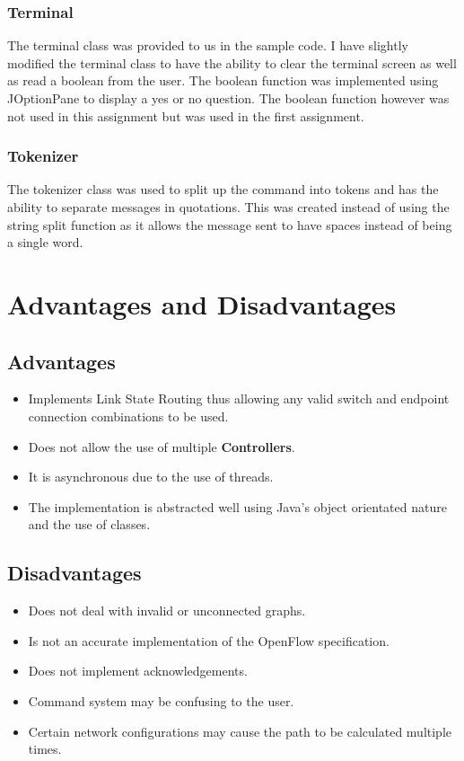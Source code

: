\documentclass{article}
\begin{document}
\subsubsection{Terminal}
The terminal class was provided to us in the sample code. I have slightly
modified the terminal class to have the ability to clear the terminal screen
as well as read a boolean from the user. The boolean function was implemented
using JOptionPane to display a yes or no question. The boolean function however
was not used in this assignment but was used in the first assignment.

\subsubsection{Tokenizer}
The tokenizer class was used to split up the command into tokens and has the
ability to separate messages in quotations. This was created instead of using
the string split function as it allows the message sent to have spaces instead
of being a single word.

\section{Advantages and Disadvantages}
\subsection{Advantages}
\begin{itemize}
  \item{Implements Link State Routing thus allowing any valid switch and
    endpoint connection combinations to be used.}
  \item{Does not allow the use of multiple \textbf{Controllers}.}
  \item{It is asynchronous due to the use of threads.}
  \item{The implementation is abstracted well using Java's object orientated
    nature and the use of classes.}
\end{itemize}
\subsection{Disadvantages}
\begin{itemize}
  \item{Does not deal with invalid or unconnected graphs.}
  \item{Is not an accurate implementation of the OpenFlow specification.}
  \item{Does not implement acknowledgements.}
  \item{Command system may be confusing to the user.}
  \item{Certain network configurations may cause the path to be calculated
    multiple times.}
\end{itemize}
\end{document}
